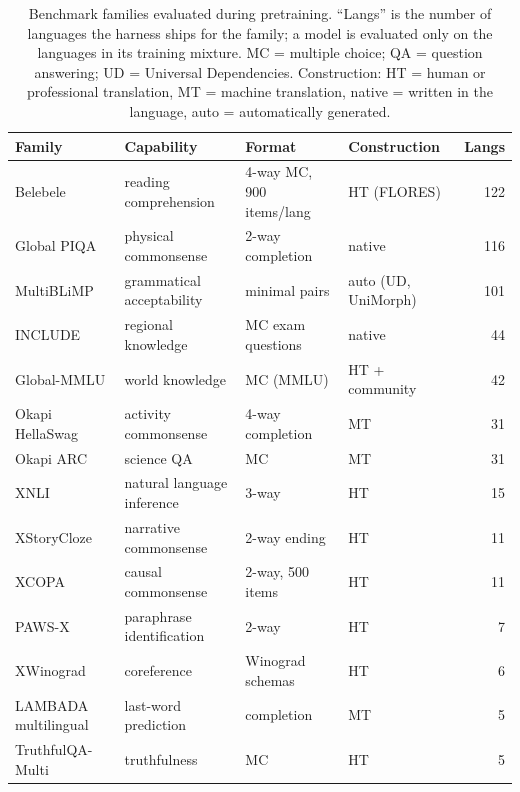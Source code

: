 \begin{table}[t]
\centering
\small
\setlength{\tabcolsep}{4pt}
\caption{Benchmark families evaluated during pretraining. ``Langs'' is the number of languages the harness ships for the family; a model is evaluated only on the languages in its training mixture. MC = multiple choice; QA = question answering; UD = Universal Dependencies. Construction: HT = human or professional translation, MT = machine translation, native = written in the language, auto = automatically generated.}
\label{tab:benchmark-families}
\begin{tabular}{llllr}
\toprule
Family & Capability & Format & Construction & Langs \\
\midrule
Belebele          & reading comprehension     & 4-way MC, 900 items/lang      & HT (FLORES)           & 122 \\
Global PIQA           & physical commonsense      & 2-way completion              & native                & 116 \\
MultiBLiMP            & grammatical acceptability & minimal pairs                 & auto (UD, UniMorph)   & 101 \\
INCLUDE             & regional knowledge        & MC exam questions             & native                &  44 \\
Global-MMLU  & world knowledge & MC (MMLU)                & HT + community        &  42 \\
Okapi HellaSwag           & activity commonsense      & 4-way completion              & MT                    &  31 \\
Okapi ARC             & science QA                & MC                            & MT                    &  31 \\
XNLI                 & natural language inference & 3-way                        & HT                    &  15 \\
XStoryCloze              & narrative commonsense     & 2-way ending                  & HT                    &  11 \\
XCOPA                  & causal commonsense        & 2-way, 500 items              & HT                    &  11 \\
PAWS-X                 & paraphrase identification & 2-way                         & HT                    &   7 \\
XWinograd     & coreference               & Winograd schemas              & HT                    &   6 \\
LAMBADA multilingual & last-word prediction & completion             & MT                    &   5 \\
TruthfulQA-Multi  & truthfulness           & MC                            & HT                    &   5 \\
\bottomrule
\end{tabular}
\end{table}

